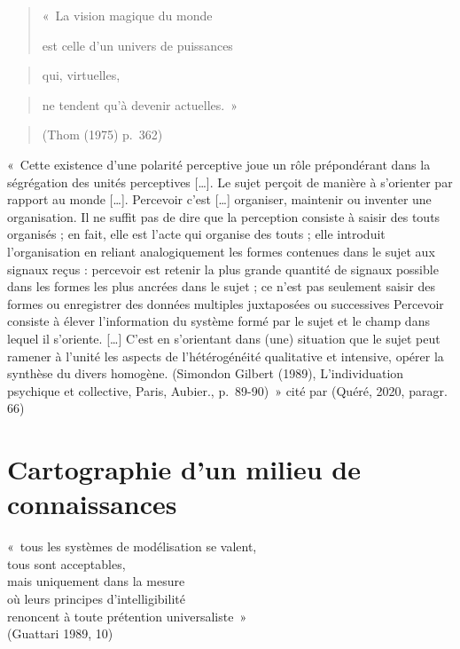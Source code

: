 \documentclass[
  letterpaper,
  DIV=11,
  numbers=noendperiod]{scrreprt}
\begin{document}

\begin{quote}
«~La vision magique du monde

est celle d'un univers de puissances
\end{quote}

\begin{quote}
qui, virtuelles,
\end{quote}

\begin{quote}
ne tendent qu'à devenir actuelles.~»
\end{quote}

\begin{quote}
(Thom (1975) p.~362)
\end{quote}

«~Cette existence d'une polarité perceptive joue un rôle prépondérant
dans la ségrégation des unités perceptives {[}\ldots{]}. Le sujet
perçoit de manière à s'orienter par rapport au monde {[}\ldots{]}.
Percevoir c'est {[}\ldots{]} organiser, maintenir ou inventer une
organisation. Il ne suffit pas de dire que la perception consiste à
saisir des touts organisés ; en fait, elle est l'acte qui organise des
touts ; elle introduit l'organisation en reliant analogiquement les
formes contenues dans le sujet aux signaux reçus : percevoir est retenir
la plus grande quantité de signaux possible dans les formes les plus
ancrées dans le sujet ; ce n'est pas seulement saisir des formes ou
enregistrer des données multiples juxtaposées ou successives Percevoir
consiste à élever l'information du système formé par le sujet et le
champ dans lequel il s'oriente. {[}\ldots{]} C'est en s'orientant dans
(une) situation que le sujet peut ramener à l'unité les aspects de
l'hétérogénéité qualitative et intensive, opérer la synthèse du divers
homogène. (Simondon Gilbert (1989), L'individuation psychique et
collective, Paris, Aubier., p.~89-90)~» cité par (Quéré, 2020, paragr.
66)

\part{Cartographie d'un milieu de connaissances}

\leavevmode{}%
«~tous les systèmes de modélisation se valent,\\
tous sont acceptables,\\
mais uniquement dans la mesure\\
où leurs principes d'intelligibilité\\
renoncent à toute prétention universaliste~»\\
(Guattari 1989, 10)
\end{document}
